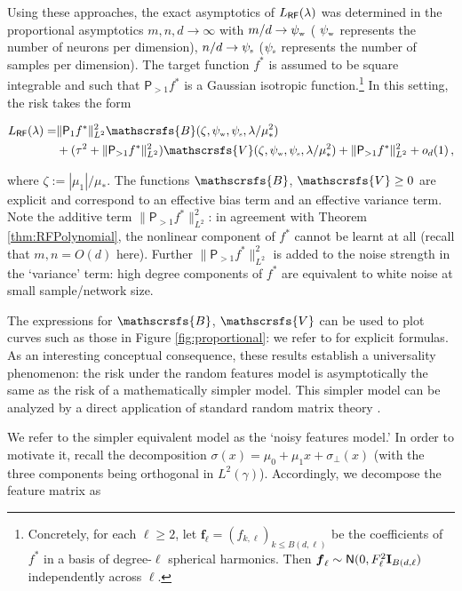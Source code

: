 Using these approaches, the exact asymptotics of   ${L}_{{\sf RF}}(\lambda)$ was determined in the proportional asymptotics $m,n,d\to\infty$ with $m/d\to \psi_{\mbox{\rm\tiny w}}$ ( $\psi_{\mbox{\rm\tiny w}}$ represents the number of neurons per dimension),
$n/d\to \psi_{\mbox{\rm\tiny s}}$ ($\psi_{\mbox{\rm\tiny s}}$ represents the number of samples per dimension). The target function $f^*$ is assumed to be square integrable and such that ${\mathsf P}_{>1}f^*$ is a Gaussian isotropic
  function.\footnote{Concretely, for each $\ell\ge 2$, let ${\boldsymbol f}_{\ell}=(f_{k,\ell})_{k\le B(d,\ell)}$ be the coefficients of $f^*$ in a basis of degree-$\ell$ spherical harmonics. Then  ${\boldsymbol f}_{\ell} \sim{\sf N}(0,F_{\ell}^2{\mathbf I}_{B(d,\ell})$
    independently across $\ell$.} In this setting, the risk takes the form

\begin{align}
  {L}_{\sf RF}(\lambda) = &\|{\mathsf P}_1f^*\|_{L^2}^2 \mathscrsfs{B}(\zeta, \psi_{\mbox{\rm\tiny w}}, \psi_{\mbox{\rm\tiny s}}, \lambda/\mu_*^2)\\
  &+ (\tau^2 + \|{\mathsf P}_{>1}f^*\|_{L^2}^2) \mathscrsfs{V}(\zeta, \psi_{\mbox{\rm\tiny w}}, \psi_{\mbox{\rm\tiny s}}, \lambda/\mu_*^2) + 
\|{\mathsf P}_{>1}f^*\|_{L^2}^2  +o_d(1)\, ,\nonumber
\end{align}

where $\zeta := |\mu_1|/\mu_*$. The functions $\mathscrsfs{B}$, $\mathscrsfs{V}\ge 0$ are explicit and correspond to an effective bias term and an effective variance term. Note the additive term $\|{\mathsf P}_{>1}f^*\|_{L^2}^2$:
in agreement with Theorem \ref{thm:RFPolynomial}, the nonlinear component of $f^*$ cannot be learnt at all (recall that $m,n =O(d)$ here). Further $\|{\mathsf P}_{>1}f^*\|_{L^2}^2$ is added to the noise strength in the `variance' term: high degree components of $f^*$ are equivalent to white noise at small sample/network size.

The expressions for $\mathscrsfs{B}$, $\mathscrsfs{V}$ can be used to plot curves such as those in Figure \ref{fig:proportional}:
we refer to \cite{mei2020generalization} for explicit formulas. As an interesting conceptual consequence, these results establish a universality phenomenon: the risk under the random features model is asymptotically the same as the risk of a mathematically simpler model. This  simpler model can be analyzed by a direct application of standard random matrix theory \cite{hastie2019surprises}.

We refer to the simpler equivalent model as the `noisy features model.' In order to motivate it, recall the decomposition
$\sigma(x) = \mu_0+\mu_1 x+\sigma_{\perp}(x)$ (with the three components being orthogonal in $L^2(\gamma)$).
Accordingly, we decompose the feature matrix as

